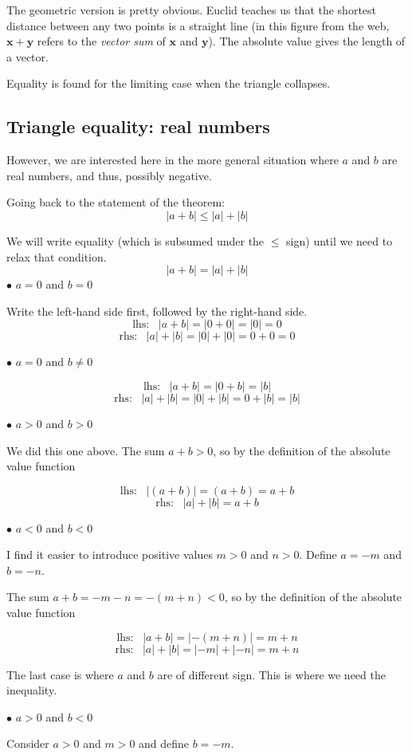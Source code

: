 \documentclass[11pt, oneside]{article}
\begin{document}
The geometric version is pretty obvious.  Euclid teaches us that the shortest distance between any two points is a straight line (in this figure from the web, $\mathbf{x + y}$ refers to the \emph{vector sum} of $\mathbf{x}$ and $\mathbf{y}$).  The absolute value gives the length of a vector.

Equality is found for the limiting case when the triangle collapses.
\subsection*{Triangle equality:  real numbers}
However, we are interested here in the more general situation where $a$ and $b$ are real numbers, and thus, possibly negative. 

Going back to the statement of the theorem:
\[ |a + b| \le |a| + |b| \]

We will write equality (which is subsumed under the $\le$ sign) until we need to relax that condition.
\[ |a + b| = |a| + |b| \]
$\bullet$  $a = 0$ and $b = 0$

Write the left-hand side first, followed by the right-hand side.
\[ \text{lhs}: \ \ \  |a + b| = |0 + 0| = |0| = 0 \]
\[ \text{rhs}: \ \ \  |a| + |b| = |0| + |0| = 0 + 0 = 0 \]

$\bullet$  $a = 0$ and $b \ne 0$

\[ \text{lhs}: \ \ \  |a + b| = |0 + b| = |b| \]
\[ \text{rhs}: \ \ \  |a| + |b| = |0| + |b| = 0 + |b| = |b| \]

$\bullet$  $a > 0$ and $b > 0$

We did this one above.  The sum $a + b > 0$, so by the definition of the absolute value function

\[ \text{lhs}: \ \ \  |(a + b)| = (a + b) = a + b \]
\[ \text{rhs}: \ \ \  |a| + |b| = a + b \]

$\bullet$  $a < 0$ and $b < 0$

I find it easier to introduce positive values $m > 0$ and $n > 0$.  Define $a = -m$ and $b = -n$.

The sum $a + b = -m -n = -(m + n)  < 0$, so by the definition of the absolute value function

\[ \text{lhs}: \ \ \  |a + b| = |-(m+n)|  = m+n \]
\[ \text{rhs}: \ \ \  |a| + |b| = |-m| + |-n| = m+n \]

The last case is where $a$ and $b$ are of different sign.  This is where we need the inequality.

$\bullet$  $a > 0$ and $b < 0$

Consider $a > 0$ and $m > 0$ and define $b = -m$.
  
\end{document}
